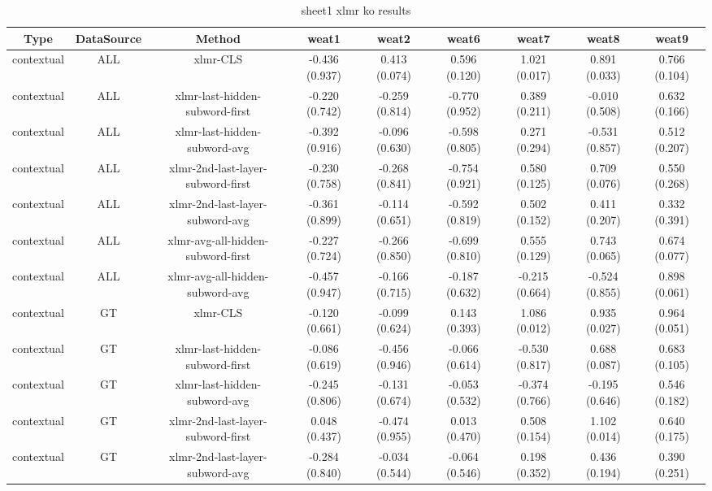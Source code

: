 \begin{sidewaystable}[htb]
    \centering
    \caption{sheet1 xlmr ko results}
    \label{appendix_tab:sheet1_xlmr_ko_results}
    \small
    \begin{tabular}{@{}ccccccccc@{}}
        \toprule
        Type & DataSource & Method & weat1 & weat2 & weat6 & weat7 & weat8 & weat9 \\
        \midrule
        contextual & ALL & xlmr-CLS & -0.436 (0.937) & 0.413 (0.074) & 0.596 (0.120) & 1.021 (0.017) & 0.891 (0.033) & 0.766 (0.104) \\
        contextual & ALL & xlmr-last-hidden-subword-first & -0.220 (0.742) & -0.259 (0.814) & -0.770 (0.952) & 0.389 (0.211) & -0.010 (0.508) & 0.632 (0.166) \\
        contextual & ALL & xlmr-last-hidden-subword-avg & -0.392 (0.916) & -0.096 (0.630) & -0.598 (0.805) & 0.271 (0.294) & -0.531 (0.857) & 0.512 (0.207) \\
        contextual & ALL & xlmr-2nd-last-layer-subword-first & -0.230 (0.758) & -0.268 (0.841) & -0.754 (0.921) & 0.580 (0.125) & 0.709 (0.076) & 0.550 (0.268) \\
        contextual & ALL & xlmr-2nd-last-layer-subword-avg & -0.361 (0.899) & -0.114 (0.651) & -0.592 (0.819) & 0.502 (0.152) & 0.411 (0.207) & 0.332 (0.391) \\
        contextual & ALL & xlmr-avg-all-hidden-subword-first & -0.227 (0.724) & -0.266 (0.850) & -0.699 (0.810) & 0.555 (0.129) & 0.743 (0.065) & 0.674 (0.077) \\
        contextual & ALL & xlmr-avg-all-hidden-subword-avg & -0.457 (0.947) & -0.166 (0.715) & -0.187 (0.632) & -0.215 (0.664) & -0.524 (0.855) & 0.898 (0.061) \\
        contextual & GT & xlmr-CLS & -0.120 (0.661) & -0.099 (0.624) & 0.143 (0.393) & 1.086 (0.012) & 0.935 (0.027) & 0.964 (0.051) \\
        contextual & GT & xlmr-last-hidden-subword-first & -0.086 (0.619) & -0.456 (0.946) & -0.066 (0.614) & -0.530 (0.817) & 0.688 (0.087) & 0.683 (0.105) \\
        contextual & GT & xlmr-last-hidden-subword-avg & -0.245 (0.806) & -0.131 (0.674) & -0.053 (0.532) & -0.374 (0.766) & -0.195 (0.646) & 0.546 (0.182) \\
        contextual & GT & xlmr-2nd-last-layer-subword-first & 0.048 (0.437) & -0.474 (0.955) & 0.013 (0.470) & 0.508 (0.154) & 1.102 (0.014) & 0.640 (0.175) \\
        contextual & GT & xlmr-2nd-last-layer-subword-avg & -0.284 (0.840) & -0.034 (0.544) & -0.064 (0.546) & 0.198 (0.352) & 0.436 (0.194) & 0.390 (0.251) \\

\end{tabular}
\end{sidewaystable}
